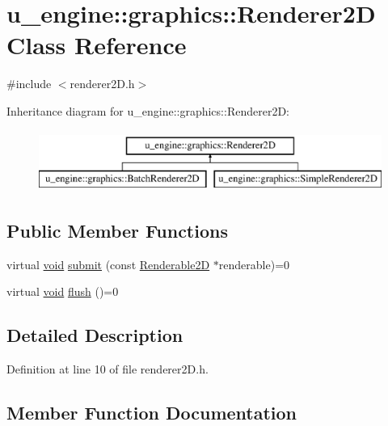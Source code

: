 \hypertarget{classu__engine_1_1graphics_1_1_renderer2_d}{}\section{u\+\_\+engine\+:\+:graphics\+:\+:Renderer2\+D Class Reference}
\label{classu__engine_1_1graphics_1_1_renderer2_d}


{\ttfamily \#include $<$renderer2\+D.\+h$>$}

Inheritance diagram for u\+\_\+engine\+:\+:graphics\+:\+:Renderer2\+D\+:\begin{figure}[H]
\begin{center}
\leavevmode
\includegraphics[height=2.000000cm]{classu__engine_1_1graphics_1_1_renderer2_d}
\end{center}
\end{figure}
\subsection*{Public Member Functions}
\begin{DoxyCompactItemize}
\item 
virtual \hyperlink{wglew_8h_aeea6e3dfae3acf232096f57d2d57f084}{void} \hyperlink{classu__engine_1_1graphics_1_1_renderer2_d_ae78a8a0ff8fc052f3cef4c24c9c829f7}{submit} (const \hyperlink{classu__engine_1_1graphics_1_1_renderable2_d}{Renderable2\+D} $\ast$renderable)=0
\item 
virtual \hyperlink{wglew_8h_aeea6e3dfae3acf232096f57d2d57f084}{void} \hyperlink{classu__engine_1_1graphics_1_1_renderer2_d_a922880dea9292d4e973c2e2da22b9964}{flush} ()=0
\end{DoxyCompactItemize}


\subsection{Detailed Description}


Definition at line 10 of file renderer2\+D.\+h.



\subsection{Member Function Documentation}
\hypertarget{classu__engine_1_1graphics_1_1_renderer2_d_a922880dea9292d4e973c2e2da22b9964}{}
